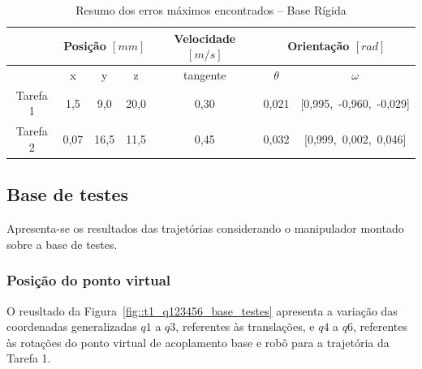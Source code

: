 \begin{table}[h!]
\centering
\caption{Resumo dos erros máximos encontrados -- Base Rígida}
\label{tab::erros_base_rig}
\begin{tabular}{@{}ccccccc@{}}
\toprule
         & \multicolumn{3}{c}{\textbf{Posição $[mm]$}} & \textbf{Velocidade $[m/s]$} & \multicolumn{2}{c}{\textbf{Orientação $[rad]$}} 	\\ \midrule
         & x          & y          & z          & tangente            & $\theta$            & $\omega$         		\\
Tarefa 1 & 1,5        & 9,0        & 20,0       & 0,30                &	0,021				& [0,995,~-0,960,~-0,029]                  	\\
Tarefa 2 & 0,07       & 16,5	   & 11,5       & 0,45                & 0,032				& [0,999,~0,002,~0,046] \\ \bottomrule
\end{tabular}
\end{table}


\subsection{Base de testes} \label{sec::res_testes}

Apresenta-se os resultados das trajetórias considerando o manipulador montado
sobre a base de testes.

\subsubsection{Posição do ponto virtual}

O reusltado da Figura~\ref{fig::t1_q123456_base_testes} apresenta a variação das
coordenadas generalizadas $q1$ a $q3$, referentes às translações, e $q4$ a $q6$,
referentes às rotações do ponto virtual de acoplamento base e robô para a
trajetória da Tarefa 1.


